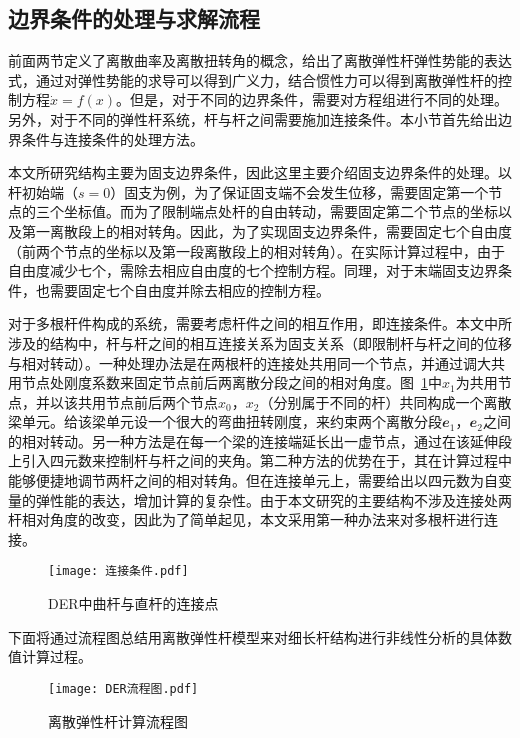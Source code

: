 \subsection{边界条件的处理与求解流程}
前面两节定义了离散曲率及离散扭转角的概念，给出了离散弹性杆弹性势能的表达式，通过对弹性势能的求导可以得到广义力，结合惯性力可以得到离散弹性杆的控制方程$\dot{x}=f(x)$。但是，对于不同的边界条件，需要对方程组进行不同的处理。另外，对于不同的弹性杆系统，杆与杆之间需要施加连接条件。本小节首先给出边界条件与连接条件的处理方法。

本文所研究结构主要为固支边界条件，因此这里主要介绍固支边界条件的处理。以杆初始端（$s=0$）固支为例，为了保证固支端不会发生位移，需要固定第一个节点的三个坐标值。而为了限制端点处杆的自由转动，需要固定第二个节点的坐标以及第一离散段上的相对转角。因此，为了实现固支边界条件，需要固定七个自由度（前两个节点的坐标以及第一段离散段上的相对转角）。在实际计算过程中，由于自由度减少七个，需除去相应自由度的七个控制方程。同理，对于末端固支边界条件，也需要固定七个自由度并除去相应的控制方程。

对于多根杆件构成的系统，需要考虑杆件之间的相互作用，即连接条件。本文中所涉及的结构中，杆与杆之间的相互连接关系为固支关系（即限制杆与杆之间的位移与相对转动）。一种处理办法是在两根杆的连接处共用同一个节点，并通过调大共用节点处刚度系数来固定节点前后两离散分段之间的相对角度\cite{huang2022natural}。图~\ref{fig:连接条件}中$x_1$为共用节点，并以该共用节点前后两个节点$x_0$，$x_2$（分别属于不同的杆）共同构成一个离散梁单元。给该梁单元设一个很大的弯曲扭转刚度，来约束两个离散分段$\mathbfit{e}_1$，$\mathbfit{e}_2$之间的相对转动。另一种方法是在每一个梁的连接端延长出一虚节点，通过在该延伸段上引入四元数来控制杆与杆之间的夹角\cite{lestringant2020modeling}。第二种方法的优势在于，其在计算过程中能够便捷地调节两杆之间的相对转角。但在连接单元上，需要给出以四元数为自变量的弹性能的表达，增加计算的复杂性。由于本文研究的主要结构不涉及连接处两杆相对角度的改变，因此为了简单起见，本文采用第一种办法来对多根杆进行连接。
\begin{figure}
	\centering
	\texttt{[image: 连接条件.pdf]}
	\caption{DER中曲杆与直杆的连接点}
	\label{fig:连接条件}
\end{figure}

下面将通过流程图总结用离散弹性杆模型来对细长杆结构进行非线性分析的具体数值计算过程。
\begin{figure}
	\centering
	\texttt{[image: DER流程图.pdf]}
	\caption{离散弹性杆计算流程图}
	\label{fig:DER_flowchart}
\end{figure}

